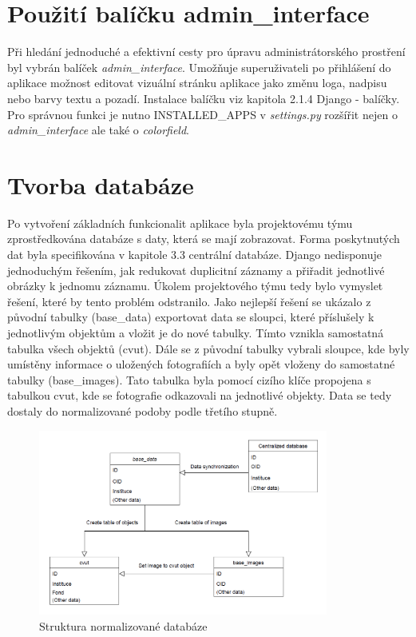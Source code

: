\newpage

\section{Použití balíčku admin\_interface}

Při hledání jednoduché a efektivní cesty pro úpravu administrátorského prostření byl vybrán balíček \emph{admin\_interface}. Umožňuje superuživateli po přihlášení do aplikace možnost editovat vizuální stránku aplikace jako změnu loga, nadpisu nebo barvy textu a pozadí. Instalace balíčku viz kapitola 2.1.4 Django - balíčky. Pro správnou funkci je nutno INSTALLED\_APPS v \emph{settings.py} rozšířit nejen o \emph{admin\_interface} ale také o \emph{colorfield}.



\section{Tvorba databáze}

Po vytvoření základních funkcionalit aplikace byla projektovému týmu zprostředkována databáze s daty, která se mají zobrazovat. Forma poskytnutých dat byla specifikována v kapitole 3.3 centrální databáze. Django nedisponuje jednoduchým řešením, jak redukovat duplicitní záznamy a přiřadit jednotlivé obrázky k jednomu záznamu. Úkolem projektového týmu tedy bylo vymyslet řešení, které by tento problém odstranilo. Jako nejlepší řešení se ukázalo z původní tabulky (base\_data) exportovat data se sloupci, které příslušely k jednotlivým objektům a vložit je do nové tabulky. Tímto vznikla samostatná tabulka všech objektů (cvut). Dále se z původní tabulky vybrali sloupce, kde byly umístěny informace o uložených fotografiích a byly opět vloženy do samostatné tabulky (base\_images). Tato tabulka byla pomocí cizího klíče propojena s tabulkou cvut, kde se fotografie odkazovali na jednotlivé objekty. Data se tedy dostaly do normalizované podoby podle třetího stupně.

\begin{figure}[H] \centering
    \includegraphics[width=270pt]{./pictures/18-db-diagram-1.PNG}
    \caption[Struktura normalizované databáze]{Struktura normalizované databáze}
	\label{fig:Struktura noramlizované databáze}              
\end{figure}


